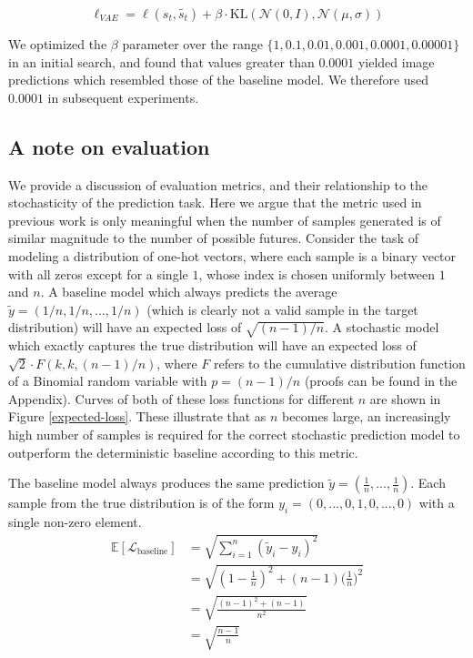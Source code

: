 \documentclass{article}
\begin{document}
\begin{equation}
\ell_{VAE} = \ell(s_t, \tilde{s_t}) + \beta \cdot \mbox{KL}(\mathcal{N}(0, I), \mathcal{N}(\mu, \sigma))
\end{equation}

We optimized the $\beta$ parameter over the range $\{1, 0.1, 0.01, 0.001, 0.0001, 0.00001 \}$ in an initial search, and found that values greater than $0.0001$ yielded image predictions which resembled those of the baseline model.
We therefore used $0.0001$ in subsequent experiments.







\subsection{A note on evaluation}

We provide a discussion of evaluation metrics, and their relationship to the stochasticity of the prediction task.
Here we argue that the metric used in previous work \citep{Walker2016, Babaeizadeh2018, Denton2018} is only meaningful when the number of samples generated is of similar magnitude to the number of possible futures.
Consider the task of modeling a distribution of one-hot vectors, where each sample is a binary vector with all zeros except for a single $1$, whose index is chosen uniformly between $1$ and $n$.
A baseline model which always predicts the average $\tilde{y} = (1/n, 1/n, ..., 1/n)$ (which is clearly not a valid sample in the target distribution) will have an expected loss of $\sqrt{(n-1)/n}$. A stochastic model which exactly captures the true distribution will have an expected loss of $\sqrt{2} \cdot F(k, k, (n-1)/n)$, where $F$ refers to the cumulative distribution function of a Binomial random variable with $p=(n-1)/n$ (proofs can be found in the Appendix).
Curves of both of these loss functions for different $n$ are shown in Figure \ref{expected-loss}.
These illustrate that as $n$ becomes large, an increasingly high number of samples is required for the correct stochastic prediction model to outperform the deterministic baseline according to this metric.


The baseline model always produces the same prediction $\tilde{y} = (\frac{1}{n}, ..., \frac{1}{n})$. Each sample from the true distribution is of the form $y_i = (0, ..., 0, 1, 0, ..., 0)$ with a single non-zero element.
\begin{align}
  \mathbb{E}[\mathcal{L}_{\mbox{baseline}}] &= \sqrt{\sum_{i=1}^n (\tilde{y}_i - y_i)^2} \\
  &= \sqrt{(1-\frac{1}{n})^2 + (n-1)\Big ( \frac{1}{n} \Big )^2} \\
  &= \sqrt{\frac{(n-1)^2 + (n-1)}{n^2}} \\
  &= \sqrt{\frac{n-1}{n}}
\end{align}
\end{document}
